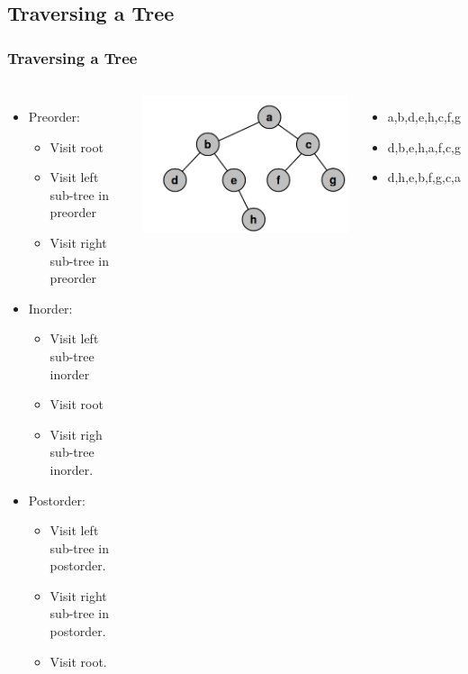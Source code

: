 \documentclass{beamer}
\begin{document}
\subsection{Traversing a Tree}
\begin{frame}
\frametitle{Traversing a Tree}
\begin{columns}[c]
\begin{itemize}
\item {\color{red} Preorder:}
\begin{itemize}
\item Visit root
\item Visit left sub-tree in preorder
\item Visit right sub-tree in preorder
\end{itemize}
\item {\color{green} Inorder:}
\begin{itemize}
\item Visit left sub-tree inorder
\item Visit root
\item Visit righ sub-tree inorder.
\end{itemize}
\item {\color{purple} Postorder:}
\begin{itemize}
\item Visit left sub-tree in postorder.
\item Visit right sub-tree in postorder.
\item Visit root.
\end{itemize}
\end{itemize}
\vline
\includegraphics[width = .8\textwidth]{bTree.png}
\begin{itemize}
\item {\color{red} a,b,d,e,h,c,f,g}
\item {\color{green} d,b,e,h,a,f,c,g}
\item {\color{purple} d,h,e,b,f,g,c,a}
\end{itemize}
\end{columns}
\end{frame}
\end{document}
